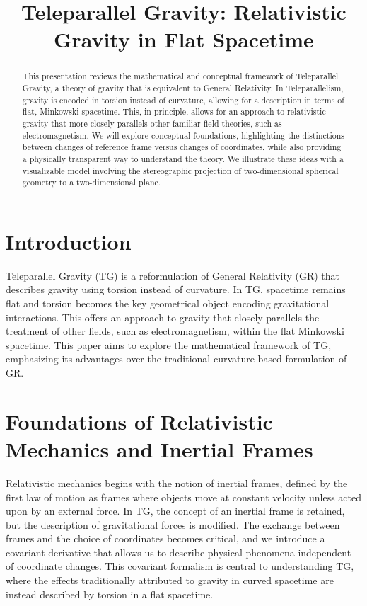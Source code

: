 \documentclass[USletter,11pt]{article}
\title{Teleparallel Gravity: Relativistic Gravity in Flat Spacetime}
\author{}
\date{}
\begin{document}
\maketitle

\begin{abstract}
This presentation reviews the mathematical and conceptual framework of Teleparallel Gravity, a theory of gravity that is equivalent to General Relativity. In Teleparallelism, gravity is encoded in torsion instead of curvature, allowing for a description in terms of flat, Minkowski spacetime. This, in principle, allows for an approach to relativistic gravity that more closely parallels other familiar field theories, such as electromagnetism. We will explore conceptual foundations, highlighting the distinctions between changes of reference frame versus changes of coordinates, while also providing a physically transparent way to understand the theory. We illustrate these ideas with a visualizable model involving the stereographic projection of two-dimensional spherical geometry to a two-dimensional plane.
\end{abstract}

\section{Introduction}
Teleparallel Gravity (TG) is a reformulation of General Relativity (GR) that describes gravity using torsion instead of curvature. In TG, spacetime remains flat and torsion becomes the key geometrical object encoding gravitational interactions. This offers an approach to gravity that closely parallels the treatment of other fields, such as electromagnetism, within the flat Minkowski spacetime. This paper aims to explore the mathematical framework of TG, emphasizing its advantages over the traditional curvature-based formulation of GR.

\section{Foundations of Relativistic Mechanics and Inertial Frames}
Relativistic mechanics begins with the notion of inertial frames, defined by the first law of motion as frames where objects move at constant velocity unless acted upon by an external force. In TG, the concept of an inertial frame is retained, but the description of gravitational forces is modified. The exchange between frames and the choice of coordinates becomes critical, and we introduce a covariant derivative that allows us to describe physical phenomena independent of coordinate changes. This covariant formalism is central to understanding TG, where the effects traditionally attributed to gravity in curved spacetime are instead described by torsion in a flat spacetime.
\end{document}
